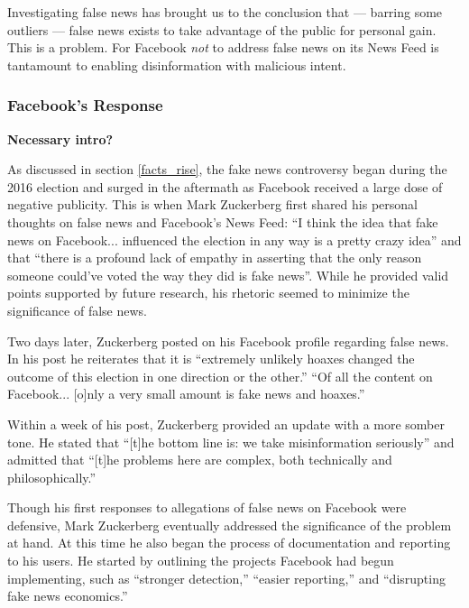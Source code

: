 
\par Investigating false news has brought us to the conclusion that --- barring some outliers --- false news exists to take advantage of the public for personal gain. This is a problem. For Facebook \emph{not} to address false news on its News Feed is tantamount to enabling disinformation with malicious intent.

\subsubsection{Facebook's Response}

\par \textbf{Necessary intro?}


\par As discussed in section \ref{facts_rise}, the fake news controversy began during the 2016 election and surged in the aftermath as Facebook received a large dose of negative publicity. \cite{tc_responsibility} This is when Mark Zuckerberg first shared his personal thoughts on false news and Facebook's News Feed: ``I think the idea that fake news on Facebook... influenced the election in any way is a pretty crazy idea'' and that ``there is a profound lack of empathy in asserting that the only reason someone could've voted the way they did is fake news''. \cite{tc_responsibility} While he provided valid points supported by future research, \cite{stanford_election} his rhetoric seemed to minimize the significance of false news. \cite{tc_responsibility}
\par Two days later, Zuckerberg posted on his Facebook profile regarding false news. In his post he reiterates that it is ``extremely unlikely hoaxes changed the outcome of this election in one direction or the other.'' ``Of all the content on Facebook... [o]nly a very small amount is fake news and hoaxes.'' \cite{zuck_resp_a} 


\par Within a week of his post, Zuckerberg provided an update with a more somber tone. He stated that ``[t]he bottom line is: we take misinformation seriously'' and admitted that ``[t]he problems here are complex, both technically and philosophically.'' \cite{zuck_resp_b}
\par Though his first responses to allegations of false news on Facebook were defensive, Mark Zuckerberg eventually addressed the significance of the problem at hand. At this time he also began the process of documentation and reporting to his users. He started by outlining the projects Facebook had begun implementing, such as ``stronger detection,'' ``easier reporting,'' and ``disrupting fake news economics.'' \cite{zuck_resp_b}

